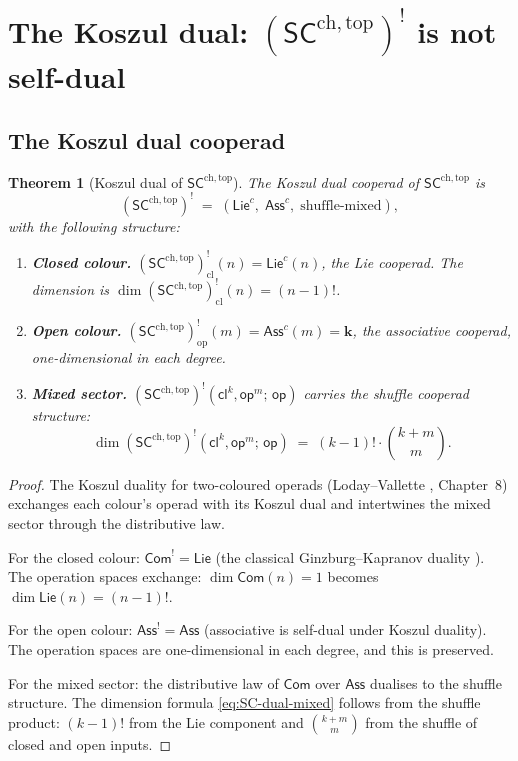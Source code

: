 \documentclass[11pt,reqno]{amsart}
\newtheorem{theorem}{Theorem}[section]
\theoremstyle{definition}
\theoremstyle{remark}
\providecommand{\Bbbk}{\mathbf{k}}
\newcommand{\SCchtop}{\mathsf{SC}^{\mathrm{ch,top}}}
\newcommand{\Ass}{\mathsf{Ass}}
\newcommand{\Com}{\mathsf{Com}}
\newcommand{\Lie}{\mathsf{Lie}}
\numberwithin{equation}{section}
\providecommand{\ClaimStatusProvedHere}{}
\begin{document}
\section{The Koszul dual: $(\SCchtop)^!$ is not self-dual}
\label{sec:koszul-dual}

\subsection{The Koszul dual cooperad}

\begin{theorem}[Koszul dual of $\SCchtop$]
\label{thm:SC-koszul-dual}
\ClaimStatusProvedHere{}
The Koszul dual cooperad of $\SCchtop$ is
\begin{equation}\label{eq:SC-dual}
  (\SCchtop)^!
  \;=\;
  (\Lie^c,\; \Ass^c,\; \text{shuffle-mixed}),
\end{equation}
with the following structure:
\begin{enumerate}[label=(\roman*)]
\item \textbf{Closed colour.}
  $(\SCchtop)^!_{\mathrm{cl}}(n) = \Lie^c(n)$, the Lie
  cooperad.  The dimension is
  $\dim (\SCchtop)^!_{\mathrm{cl}}(n) = (n-1)!$.
\item \textbf{Open colour.}
  $(\SCchtop)^!_{\mathrm{op}}(m) = \Ass^c(m) = \Bbbk$,
  the associative cooperad, one-dimensional in each degree.
\item \textbf{Mixed sector.}
  $(\SCchtop)^!(\mathsf{cl}^k, \mathsf{op}^m;\, \mathsf{op})$
  carries the shuffle cooperad structure:
  \begin{equation}\label{eq:SC-dual-mixed}
    \dim(\SCchtop)^!(\mathsf{cl}^k, \mathsf{op}^m;\, \mathsf{op})
    \;=\;
    (k-1)! \cdot \binom{k+m}{m}.
  \end{equation}
\end{enumerate}
\end{theorem}

\begin{proof}
The Koszul duality for two-coloured operads
(Loday--Vallette \cite{LV12}, Chapter~8) exchanges each
colour's operad with its Koszul dual and intertwines the mixed
sector through the distributive law.

For the closed colour: $\Com^! = \Lie$ (the classical
Ginzburg--Kapranov duality \cite{GK94}).  The operation spaces
exchange: $\dim\Com(n) = 1$ becomes
$\dim\Lie(n) = (n-1)!$.

For the open colour: $\Ass^! = \Ass$ (associative is
self-dual under Koszul duality).  The operation spaces
are one-dimensional in each degree, and this is preserved.

For the mixed sector: the distributive law of
$\Com$ over $\Ass$ dualises to the shuffle structure.  The
dimension formula \eqref{eq:SC-dual-mixed} follows from
the shuffle product: $(k-1)!$ from the Lie component and
$\binom{k+m}{m}$ from the shuffle of closed and open inputs.
\end{proof}
\end{document}
